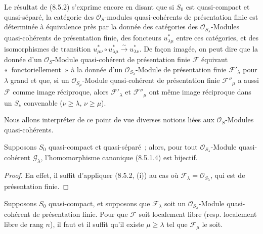 \begin{scholium}[8.5.3]
\label{IV.8.5.3-fr}
Le résultat de (8.5.2) s'exprime encore en disant que si $S_0$ est
quasi-compact et quasi-séparé, la catégorie des $\mathcal O_S$-modules
quasi-cohérents de présentation finie est déterminée à équivalence près par la
donnée des catégories des $\mathcal O_{S_\lambda}$-Modules quasi-cohérents de
présentation finie, des foncteurs $u_{\lambda\mu}^*$ entre ces catégories, et
des isomorphismes de transition
$u_{\mu\nu}^*\circ u_{\lambda\mu}^*\xrightarrow{\sim}u_{\lambda\nu}^*$. De façon
imagée, on peut dire que la donnée d'un $\mathcal O_S$-Module quasi-cohérent de
présentation finie $\mathcal F$ équivaut «~fonctoriellement~» à la donnée d'un
$\mathcal O_{S_\lambda}$-Module de présentation finie $\mathcal F'_\lambda$
pour $\lambda$ grand et que, si un $\mathcal O_{S_\mu}$-Module quasi-cohérent de
présentation finie $\mathcal F''_\mu$ a aussi $\mathcal F$ comme image
réciproque, alors $\mathcal F'_\lambda$ et $\mathcal F''_\mu$ ont même image
réciproque dans un $S_\nu$ convenable ($\nu\geq\lambda$, $\nu\geq\mu$).

Nous allons interpréter de ce point de vue diverses notions liées aux
$\mathcal O_S$-Modules quasi-cohérents.
\end{scholium}

\begin{corollary}[8.5.4]
\label{IV.8.5.4-fr}
Supposons $S_0$ quasi-compact et quasi-séparé~; alors, pour tout
$\mathcal O_{S_\lambda}$-Module quasi-cohérent $\mathcal G_\lambda$,
l'homomorphisme canonique \textup{(8.5.1.4)} est bijectif.
\end{corollary}

\begin{proof}
En effet, il suffit d'appliquer (8.5.2, (i)) au cas où
$\mathcal F_\lambda=\mathcal O_{S_\lambda}$, qui est de présentation finie.
\end{proof}

\begin{proposition}[8.5.5]
\label{IV.8.5.5-fr}
Supposons $S_0$ quasi-compact, et supposons que $\mathcal F_\lambda$ soit un
$\mathcal O_{S_\lambda}$-Module quasi-cohérent de présentation finie. Pour que
$\mathcal F$ soit localement libre (\textup{resp.} localement libre de rang $n$), il
faut et il suffit qu'il existe $\mu\geq\lambda$ tel que $\mathcal F_\mu$ le
soit.
\end{proposition}

